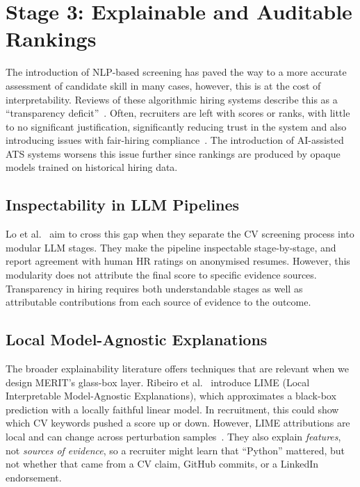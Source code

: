 \section{Stage 3: Explainable and Auditable Rankings}
\label{sec:lit-transparency}

The introduction of NLP-based screening has paved the way to a more accurate assessment of candidate skill in
many cases, however, this is at the cost of interpretability. Reviews of these algorithmic hiring systems describe
this as a ``transparency deficit''~\cite{bogen2018}. Often, recruiters are left with scores or ranks, with little
to no significant justification, significantly reducing trust in the system and also introducing
issues with fair-hiring compliance~\cite{raghavan2020,bogen2018}. The introduction of AI-assisted ATS systems
worsens this issue further since rankings are produced by opaque models trained on historical hiring data.

\subsection{Inspectability in LLM Pipelines}
Lo et al.~\cite{lo2025aihiring} aim to cross this gap when they separate the CV screening process into modular LLM stages.
They make the pipeline inspectable stage-by-stage, and report agreement with human HR ratings on anonymised resumes.
However, this modularity does not attribute the final score to specific evidence sources. Transparency in
hiring requires both understandable stages as well as attributable contributions from each source of evidence
to the outcome.

\subsection{Local Model-Agnostic Explanations}
The broader explainability literature offers techniques that are relevant when we design MERIT's glass-box layer.
Ribeiro et al.~\cite{ribeiro2016lime} introduce LIME (Local Interpretable Model-Agnostic Explanations), which approximates
a black-box prediction with a locally faithful linear model. In recruitment, this could show which CV keywords pushed a score
up or down. However, LIME attributions are local and can change across perturbation samples~\cite{ribeiro2016lime}. They also
explain \emph{features}, not \emph{sources of evidence}, so a recruiter might learn that ``Python'' mattered, but not whether that
came from a CV claim, GitHub commits, or a LinkedIn endorsement.

